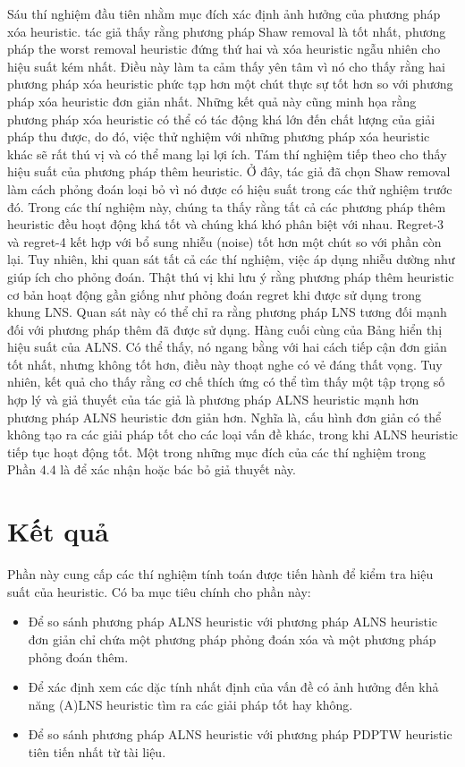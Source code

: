 Sáu thí nghiệm đầu tiên nhằm mục đích xác định ảnh hưởng của phương pháp xóa heuristic. tác giả thấy rằng phương pháp Shaw removal là tốt nhất, phương pháp the worst removal heuristic đứng thứ hai và xóa heuristic ngẫu nhiên cho hiệu suất kém nhất. Điều này làm ta cảm thấy yên tâm vì nó cho thấy rằng hai phương pháp xóa heuristic phức tạp hơn một chút thực sự tốt hơn so với phương pháp xóa heuristic đơn giản nhất. Những kết quả này cũng minh họa rằng phương pháp xóa heuristic có thể có tác động khá lớn đến chất lượng của giải pháp thu được, do đó, việc thử nghiệm với những phương pháp xóa heuristic khác sẽ rất thú vị và có thể mang lại lợi ích.
Tám thí nghiệm tiếp theo cho thấy hiệu suất của phương pháp thêm heuristic. Ở đây, tác giả đã chọn Shaw removal làm cách phỏng đoán loại bỏ vì nó được có hiệu suất trong các thử nghiệm trước đó. Trong các thí nghiệm này, chúng ta thấy rằng tất cả các phương pháp thêm heuristic đều hoạt động khá tốt và chúng khá khó phân biệt với nhau. Regret-3 và regret-4 kết hợp với bổ sung nhiễu (noise) tốt hơn một chút so với phần còn lại. Tuy nhiên, khi quan sát tất cả các thí nghiệm, việc áp dụng nhiễu dường như giúp ích cho phỏng đoán. Thật thú vị khi lưu ý rằng phương pháp thêm heuristic cơ bản hoạt động gần giống như phỏng đoán regret khi được sử dụng trong khung LNS. Quan sát này có thể chỉ ra rằng phương pháp LNS tương đối mạnh đối với phương pháp thêm đã được sử dụng.
Hàng cuối cùng của Bảng hiển thị hiệu suất của ALNS. Có thể thấy, nó ngang bằng với hai cách tiếp cận đơn giản tốt nhất, nhưng không tốt hơn, điều này thoạt nghe có vẻ đáng thất vọng. Tuy nhiên, kết quả cho thấy rằng cơ chế thích ứng có thể tìm thấy một tập trọng số hợp lý và giả thuyết của tác giả là phương pháp ALNS heuristic mạnh hơn phương pháp ALNS heuristic đơn giản hơn. Nghĩa là, cấu hình đơn giản có thể không tạo ra các giải pháp tốt cho các loại vấn đề khác, trong khi ALNS heuristic tiếp tục hoạt động tốt.
Một trong những mục đích của các thí nghiệm trong Phần 4.4 là để xác nhận hoặc bác bỏ giả thuyết này.

\section{Kết quả}
Phần này cung cấp các thí nghiệm tính toán được tiến hành để kiểm tra hiệu suất của heuristic. Có ba mục tiêu chính cho phần này:
\begin{itemize}
    \item Để so sánh phương pháp ALNS heuristic với phương pháp ALNS heuristic đơn giản chỉ chứa một phương pháp phỏng đoán xóa và một phương pháp phỏng đoán thêm.
    \item Để xác định xem các dặc tính nhất định của vấn đề có ảnh hưởng đến khả năng (A)LNS heuristic tìm ra các giải pháp tốt hay không.
    \item Để so sánh phương pháp ALNS heuristic với phương pháp PDPTW heuristic tiên tiến nhất từ tài liệu.
   
\end{itemize}

